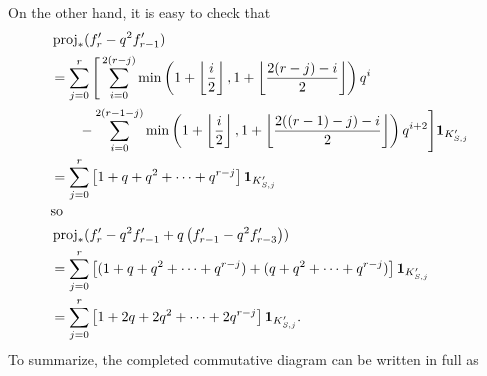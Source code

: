 On the other hand, it is easy to check that
\begin{align*}
  &\operatorname{proj}_\ast(f'_r -q^2 f'_{r-1}) \\
  &= \sum_{j=0}^r \Bigg[
      \sum_{i=0}^{2(r-j)} \min \left( 1 + \left\lfloor \frac i2 \right\rfloor,
      1 + \left\lfloor \frac{2(r-j)-i}{2} \right\rfloor \right) q^i \\
  &\qquad - \sum_{i=0}^{2(r-1-j)} \min \left( 1 + \left\lfloor \frac i2 \right\rfloor,
    1 + \left\lfloor \frac{2((r-1)-j)-i}{2} \right\rfloor \right) q^{i+2}
  \Bigg] \mathbf{1}_{K'_{S,j}} \\
  &= \sum_{j=0}^r \left[ 1+q+q^2+\dots+q^{r-j} \right] \mathbf{1}_{K'_{S,j}} \\
  \intertext{so}
  &\operatorname{proj}_\ast(f'_r -q^2 f'_{r-1} + q \left( f'_{r-1} - q^2 f'_{r-3} \right)) \\
  &= \sum_{j=0}^r \left[ (1+q+q^2+\dots+q^{r-j})+(q+q^2+\dots+q^{r-j}) \right] \mathbf{1}_{K'_{S,j}} \\
  &= \sum_{j=0}^r \left[ 1 + 2q + 2q^2 + \dots + 2q^{r-j} \right] \mathbf{1}_{K'_{S,j}}.
\end{align*}
To summarize, the completed commutative diagram can be written in full as
\begin{center}
\end{center}

